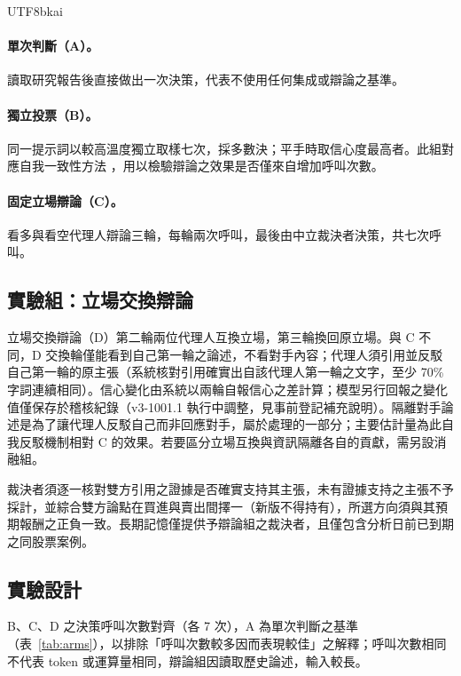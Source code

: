 \documentclass[12pt,a4paper]{article}
\newcommand{\grp}[1]{\textsf{#1}}
\begin{document}
\begin{CJK}{UTF8}{bkai}
\paragraph{單次判斷（\grp{A}）。}
讀取研究報告後直接做出一次決策，代表不使用任何集成或辯論之基準。

\paragraph{獨立投票（\grp{B}）。}
同一提示詞以較高溫度獨立取樣七次，採多數決；平手時取信心度最高者。此組對應自我一致性方法 \citep{wang2023selfconsistency}，用以檢驗辯論之效果是否僅來自增加呼叫次數。

\paragraph{固定立場辯論（\grp{C}）。}
看多與看空代理人辯論三輪，每輪兩次呼叫，最後由中立裁決者決策，共七次呼叫。

\subsection{實驗組：立場交換辯論}

立場交換辯論（\grp{D}）第二輪兩位代理人互換立場，第三輪換回原立場。與 \grp{C} 不同，\grp{D} 交換輪僅能看到自己第一輪之論述，不看對手內容；代理人須引用並反駁自己第一輪的原主張（系統核對引用確實出自該代理人第一輪之文字，至少 70\% 字詞連續相同）。信心變化由系統以兩輪自報信心之差計算；模型另行回報之變化值僅保存於稽核紀錄（v3-1001.1 執行中調整，見事前登記補充說明）。隔離對手論述是為了讓代理人反駁自己而非回應對手，屬於處理的一部分；主要估計量為此自我反駁機制相對 \grp{C} 的效果。若要區分立場互換與資訊隔離各自的貢獻，需另設消融組。

裁決者須逐一核對雙方引用之證據是否確實支持其主張，未有證據支持之主張不予採計，並綜合雙方論點在買進與賣出間擇一（新版不得持有），所選方向須與其預期報酬之正負一致。長期記憶僅提供予辯論組之裁決者，且僅包含分析日前已到期之同股票案例。

\subsection{實驗設計}

\grp{B}、\grp{C}、\grp{D} 之決策呼叫次數對齊（各 7 次），\grp{A} 為單次判斷之基準（表~\ref{tab:arms}），以排除「呼叫次數較多因而表現較佳」之解釋；呼叫次數相同不代表 token 或運算量相同，辯論組因讀取歷史論述，輸入較長。


\end{CJK}
\end{document}
